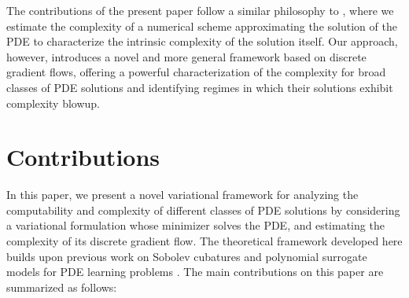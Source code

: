 \documentclass[pdflatex]{sn-jnl}%
\begin{document}
The contributions of the present paper follow a similar philosophy to \cite{Koswara2021-sr}, where we estimate the complexity of a numerical scheme approximating the solution of the PDE to characterize the intrinsic complexity of the solution itself. Our approach, however, introduces a novel and more general framework based on discrete gradient flows, offering a powerful characterization of the complexity for broad classes of PDE solutions and identifying regimes in which their solutions exhibit complexity blowup.
\section{Contributions}
In this paper, we present a novel variational framework for analyzing the computability and complexity of different classes of PDE solutions by considering a variational formulation whose minimizer solves the PDE, and estimating the complexity of its discrete gradient flow. The theoretical framework developed here builds upon previous work on Sobolev cubatures \cite{Cardona2023-ma, Suarez2025} and polynomial surrogate models for PDE learning problems \cite{Cardona2024-sr}. The main contributions on this paper are summarized as follows:
\end{document}
